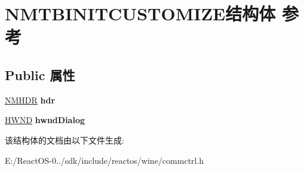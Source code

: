 \hypertarget{struct_n_m_t_b_i_n_i_t_c_u_s_t_o_m_i_z_e}{}\section{N\+M\+T\+B\+I\+N\+I\+T\+C\+U\+S\+T\+O\+M\+I\+Z\+E结构体 参考}
\label{struct_n_m_t_b_i_n_i_t_c_u_s_t_o_m_i_z_e}
\subsection*{Public 属性}
\begin{DoxyCompactItemize}
\item 
\mbox{\label{struct_n_m_t_b_i_n_i_t_c_u_s_t_o_m_i_z_e_ae01cc35d61b30f8b1ab67083fbef35df}} 
\hyperlink{structtag_n_m_h_d_r}{N\+M\+H\+DR} {\bfseries hdr}
\item 
\mbox{\label{struct_n_m_t_b_i_n_i_t_c_u_s_t_o_m_i_z_e_accc0b3d38de15826d323aaee427efd70}} 
\hyperlink{interfacevoid}{H\+W\+ND} {\bfseries hwnd\+Dialog}
\end{DoxyCompactItemize}


该结构体的文档由以下文件生成\+:\begin{DoxyCompactItemize}
\item 
E\+:/\+React\+O\+S-\/0../sdk/include/reactos/wine/commctrl.\+h\end{DoxyCompactItemize}
